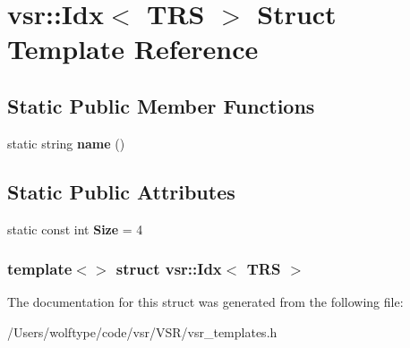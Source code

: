 \hypertarget{structvsr_1_1_idx_3_01_t_r_s_01_4}{\section{vsr\-:\-:Idx$<$ T\-R\-S $>$ Struct Template Reference}
\label{structvsr_1_1_idx_3_01_t_r_s_01_4}
}
\subsection*{Static Public Member Functions}
\begin{DoxyCompactItemize}
\item 
\hypertarget{structvsr_1_1_idx_3_01_t_r_s_01_4_a46fe8dd938701662a410aecc5bef1c2c}{static string {\bfseries name} ()}\label{structvsr_1_1_idx_3_01_t_r_s_01_4_a46fe8dd938701662a410aecc5bef1c2c}

\end{DoxyCompactItemize}
\subsection*{Static Public Attributes}
\begin{DoxyCompactItemize}
\item 
\hypertarget{structvsr_1_1_idx_3_01_t_r_s_01_4_aadafebc936f3f4751e28b6019a5b2c24}{static const int {\bfseries Size} = 4}\label{structvsr_1_1_idx_3_01_t_r_s_01_4_aadafebc936f3f4751e28b6019a5b2c24}

\end{DoxyCompactItemize}
\subsubsection*{template$<$$>$ struct vsr\-::\-Idx$<$ T\-R\-S $>$}



The documentation for this struct was generated from the following file\-:\begin{DoxyCompactItemize}
\item 
/\-Users/wolftype/code/vsr/\-V\-S\-R/vsr\-\_\-templates.\-h\end{DoxyCompactItemize}

